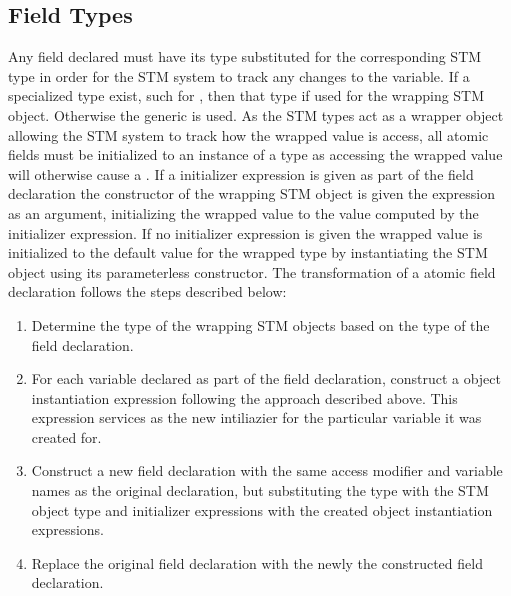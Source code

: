 \subsection{Field Types}\label{subsec:extension_field}
Any field declared  must have its type substituted for the corresponding \ac{STM} type in order for the \ac{STM} system to track any changes to the variable. If a specialized type exist, such  for , then that type if used for the wrapping \ac{STM} object. Otherwise the generic  is used.  As the \ac{STM} types act as a wrapper object allowing the \ac{STM} system to track how the wrapped value is access, all atomic fields must be initialized to an instance of a  type as accessing the wrapped value will otherwise cause a . If a initializer expression is given as part of the field declaration the constructor of the wrapping \ac{STM} object is given the expression as an argument, initializing the wrapped value to the value computed by the initializer expression. If no initializer expression is given the wrapped value is initialized to the default value for the wrapped type by instantiating the \ac{STM} object using its parameterless constructor. The transformation of a atomic field declaration follows the steps described below:

\begin{enumerate}
	\item Determine the type of the wrapping \ac{STM} objects based on the type of the field declaration.
	\item For each variable declared as part of the field declaration, construct a object instantiation expression following the approach described above. This expression services as the new intiliazier for the particular variable it was created for.
	\item Construct a new field declaration with the same access modifier and variable names as the original declaration, but substituting the type with the \ac{STM} object type and initializer expressions with the created object instantiation expressions.
	\item Replace the original field declaration with the newly the constructed field declaration. 
\end{enumerate}

